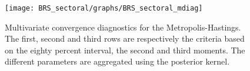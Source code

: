  
\begin{figure}[H]
\centering 
\texttt{[image: BRS\_sectoral/graphs/BRS\_sectoral\_mdiag]}
\caption{Multivariate convergence diagnostics for the Metropolis-Hastings.
The first, second and third rows are respectively the criteria based on
the eighty percent interval, the second and third moments. The different 
parameters are aggregated using the posterior kernel.}\label{Fig:MultivariateDiagnostics}
\end{figure}

